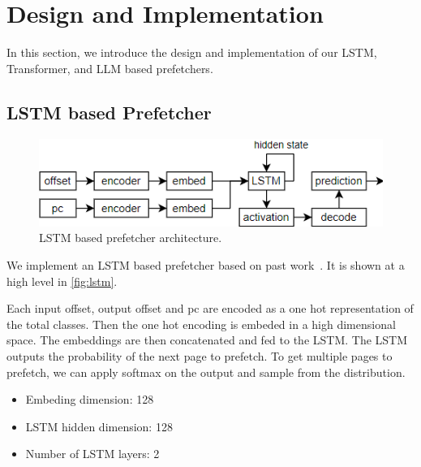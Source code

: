 \section{Design and Implementation} \label{sec:4}

In this section, we introduce the design and implementation of our LSTM, Transformer, and LLM based prefetchers. 


\subsection{LSTM based Prefetcher} \label{sec:4.1}

\begin{figure}[]
\centering
\includegraphics[width=\columnwidth]{images/LSTM.png}
\caption{LSTM based prefetcher architecture.}
\label{fig:lstm}
\end{figure}

We implement an LSTM based prefetcher based on past work~\cite{LMAP}. It is shown at a high level in \autoref{fig:lstm}.

Each input offset, output offset and pc are encoded as a one hot representation of the total classes. Then the one hot encoding is embeded in a high dimensional space. The embeddings are then concatenated and fed to the LSTM. The LSTM outputs the probability of the next page to prefetch. To get multiple pages to prefetch, we can apply softmax on the output and sample from the distribution. 

\begin{itemize}
    \item Embeding dimension: 128
    \item LSTM hidden dimension: 128
    \item Number of LSTM layers: 2
\end{itemize}

